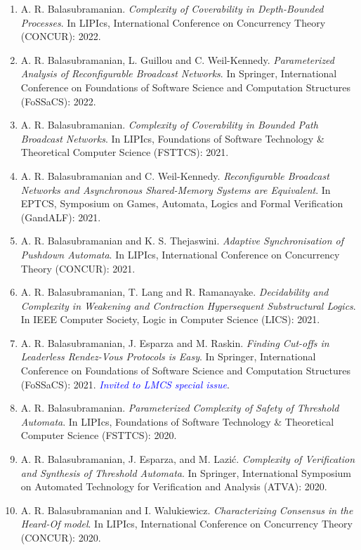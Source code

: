 \documentclass[11pt,a4paper,sans]{moderncv}        %
\begin{document}
\begin{enumerate}
	\textit{\textcolor{blue}{Invited to Fundamenta Infomaticae special issue}}.
	\item A. R. Balasubramanian.
	\textit{Complexity of Coverability in Depth-Bounded Processes}.
	In LIPIcs, International Conference on Concurrency Theory (CONCUR): 2022.
	\item A. R. Balasubramanian, L. Guillou and C. Weil-Kennedy.
	\textit{Parameterized Analysis of Reconfigurable Broadcast Networks}.
	In Springer, International Conference on Foundations of Software Science and Computation Structures (FoSSaCS): 2022.
	\item A. R. Balasubramanian.
	\textit{Complexity of Coverability in Bounded Path Broadcast Networks}.
	In LIPIcs, Foundations of Software Technology \& Theoretical Computer Science (FSTTCS): 2021.
	\item A. R. Balasubramanian and C. Weil-Kennedy.
	\textit{Reconfigurable Broadcast Networks and Asynchronous Shared-Memory Systems are Equivalent}.
	In EPTCS, Symposium on Games, Automata, Logics and Formal Verification (GandALF): 2021.
	\item A. R. Balasubramanian and K. S. Thejaswini.
	\textit{Adaptive Synchronisation of Pushdown Automata}.
	In LIPIcs, International Conference on Concurrency Theory (CONCUR): 2021.
	\item A. R. Balasubramanian, T. Lang and R. Ramanayake.
	\textit{Decidability and Complexity in Weakening and Contraction Hypersequent Substructural Logics}.
	In IEEE Computer Society, Logic in Computer Science (LICS): 2021.
	\item A. R. Balasubramanian, J. Esparza and M. Raskin.
	\textit{Finding Cut-offs in Leaderless Rendez-Vous Protocols is Easy}.
	In Springer, International Conference on Foundations of Software Science and Computation Structures (FoSSaCS): 2021. \textit{\textcolor{blue}{Invited to LMCS special issue}}.
	\item A. R. Balasubramanian. \textit{Parameterized Complexity of Safety of Threshold Automata}.
	In LIPIcs, Foundations of Software Technology \& Theoretical Computer Science (FSTTCS): 2020.
	\item A. R. Balasubramanian, J. Esparza, and M. Lazić.
	\textit{Complexity of Verification and Synthesis of Threshold Automata}.
	In Springer, International Symposium on Automated Technology for Verification and Analysis (ATVA): 2020.
	\item A. R. Balasubramanian and I. Walukiewicz. \textit{Characterizing Consensus in the Heard-Of model}.
	In LIPIcs, International Conference on Concurrency Theory (CONCUR): 2020.

\end{enumerate}
\end{document}
